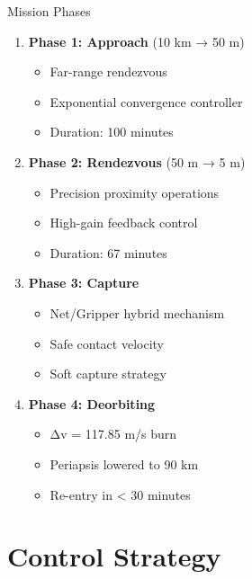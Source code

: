 \documentclass[aspectratio=169]{beamer}
\begin{document}
\begin{frame}{Mission Phases}
\begin{enumerate}
    \item \textbf{Phase 1: Approach} (10 km → 50 m)
    \begin{itemize}
        \item Far-range rendezvous
        \item Exponential convergence controller
        \item Duration: 100 minutes
    \end{itemize}

    \item \textbf{Phase 2: Rendezvous} (50 m → 5 m)
    \begin{itemize}
        \item Precision proximity operations
        \item High-gain feedback control
        \item Duration: 67 minutes
    \end{itemize}

    \item \textbf{Phase 3: Capture}
    \begin{itemize}
        \item Net/Gripper hybrid mechanism
        \item Safe contact velocity
        \item Soft capture strategy
    \end{itemize}

    \item \textbf{Phase 4: Deorbiting}
    \begin{itemize}
        \item Δv = 117.85 m/s burn
        \item Periapsis lowered to 90 km
        \item Re-entry in < 30 minutes
    \end{itemize}
\end{enumerate}
\end{frame}

\section{Control Strategy}
\end{document}
